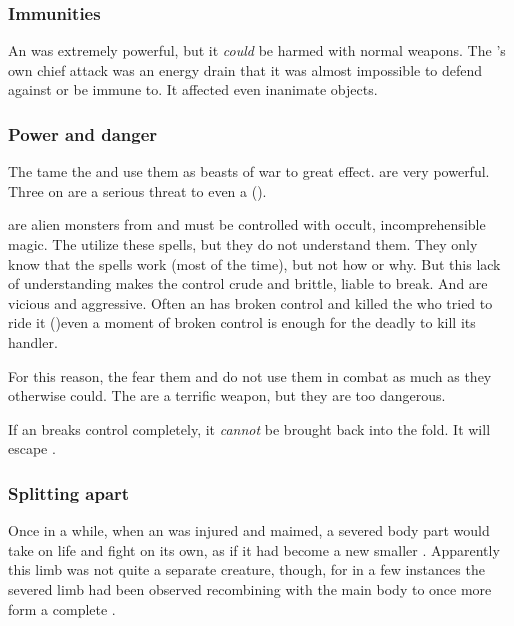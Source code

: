 \subsubsection{Immunities}
An \umbra was extremely powerful, but it \emph{could} be harmed with normal weapons. 
The \umbra's own chief attack was an energy drain that it was almost impossible to defend against or be immune to.
It affected even inanimate objects. 





\subsubsection{Power and danger}
The \resphain{} tame the \umbrae{} and use them as beasts of war to great effect. 
\Umbrae{} are very powerful. 
Three \resphain{} on \umbrae{} are a serious threat to even a \dragon{} ().

\Umbrae{} are alien monsters from \Erebos{} and must be controlled with occult, incomprehensible \bane{} magic. 
The \resphain{} utilize these spells, but they do not understand them. 
They only know that the spells work (most of the time), but not how or why. 
But this lack of understanding makes the control crude and brittle, liable to break. 
And \umbrae{} are vicious and aggressive. 
Often an \umbra{} has broken control and killed the \resphan{} who tried to ride it ()\dash even a moment of broken control is enough for the deadly \umbra{} to kill its handler. 

For this reason, the \resphain{} fear them and do not use them in combat as much as they otherwise could. 
The \umbrae{} are a terrific weapon, but they are too dangerous. 

If an \umbra{} breaks control completely, it \emph{cannot} be brought back into the fold. 
It will escape . 





\subsubsection{Splitting apart}
Once in a while, when an \umbra was injured and maimed, a severed body part would take on life and fight on its own, as if it had become a new smaller \umbra. 
Apparently this limb was not quite a separate creature, though, for in a few instances the severed limb had been observed recombining with the main body to once more form a complete \umbra. 

